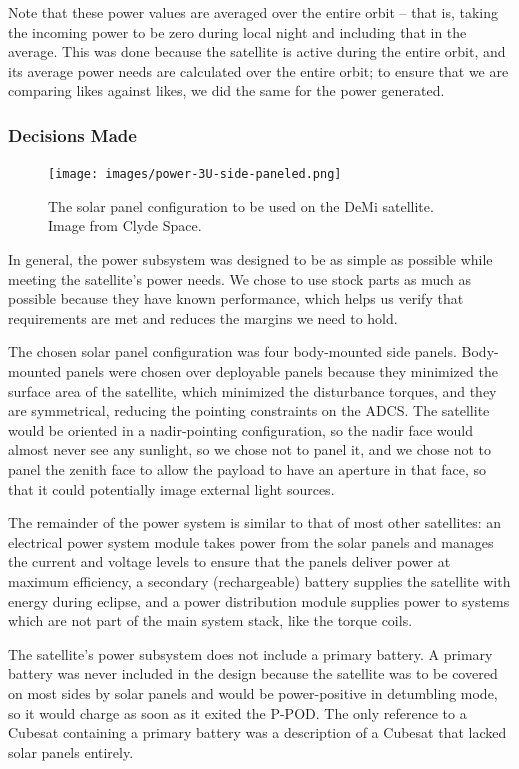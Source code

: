 \documentclass[12pt]{article}
\begin{document}
Note that these power values are averaged over the entire orbit -- that is, taking the incoming power to be zero during local night and including that in the average.  This was done because the satellite is active during the entire orbit, and its average power needs are calculated over the entire orbit; to ensure that we are comparing likes against likes, we did the same for the power generated.
			
			\subsubsection{Decisions Made}
			
			\begin{figure}%
			\centering
			\texttt{[image: images/power-3U-side-paneled.png]}%
			\caption{The solar panel configuration to be used on the DeMi satellite.  Image from Clyde Space.\cite{CS-image}}%
			\label{fig:power-panels}%
			\end{figure}
			
In general, the power subsystem was designed to be as simple as possible while meeting the satellite's power needs.  We chose to use stock parts as much as possible because they have known performance, which helps us verify that requirements are met and reduces the margins we need to hold.

The chosen solar panel configuration was four body-mounted side panels.  Body-mounted panels were chosen over deployable panels because they minimized the surface area of the satellite, which minimized the disturbance torques, and they are symmetrical, reducing the pointing constraints on the ADCS.  The satellite would be oriented in a nadir-pointing configuration, so the nadir face would almost never see any sunlight, so we chose not to panel it, and we chose not to panel the zenith face to allow the payload to have an aperture in that face, so that it could potentially image external light sources.

The remainder of the power system is similar to that of most other satellites: an electrical power system module takes power from the solar panels and manages the current and voltage levels to ensure that the panels deliver power at maximum efficiency, a secondary (rechargeable) battery supplies the satellite with energy during eclipse, and a power distribution module supplies power to systems which are not part of the main system stack, like the torque coils.

The satellite's power subsystem does not include a primary battery.  A primary battery was never included in the design because the satellite was to be covered on most sides by solar panels and would be power-positive in detumbling mode, so it would charge as soon as it exited the P-POD.  The only reference to a Cubesat containing a primary battery was a description of a Cubesat that lacked solar panels entirely.\cite{libertad-1}
			
\end{document}
